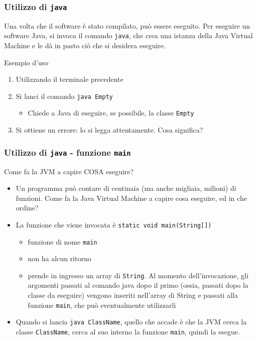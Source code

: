 \documentclass{beamer}
\begin{document}
\begin{frame}[fragile]
\frametitle{Utilizzo di \texttt{java}}
Una volta che il software è stato compilato, può essere eseguito. Per eseguire un software Java, si invoca il comando \texttt{java}, che crea una istanza della Java Virtual Machine e le dà in pasto ciò che si desidera eseguire.
\begin{block}{Esempio d'uso}
\begin{enumerate}
 \item Utilizzando il terminale precedente
 \item Si lanci il comando \texttt{java Empty}
 \begin{itemize}
  \item Chiede a Java di eseguire, se possibile, la classe \texttt{Empty}
 \end{itemize}
 \item Si ottiene un errore: lo si legga attentamente. Cosa significa?
\end{enumerate}
\end{block}
\end{frame}

\begin{frame}[fragile]
\frametitle{Utilizzo di \texttt{java} - funzione \texttt{main}}
\begin{block}{Come fa la JVM a capire COSA eseguire?}
\begin{itemize}
 \item Un programma può contare di centinaia (ma anche migliaia, milioni) di funzioni. Come fa la Java Virtual Machine a capire cosa eseguire, ed in che ordine?
 \item La funzione che viene invocata è \texttt{static void main(String[])}
 \begin{itemize}
  \item funzione di nome \texttt{main}
  \item non ha alcun ritorno
  \item prende in ingresso un array di \texttt{String}. Al momento dell'invocazione, gli argomenti passati al comando java dopo il primo (ossia, passati dopo la classe da eseguire) vengono inseriti nell'array di String e passati alla funzione \texttt{main}, che può eventualmente utilizzarli
 \end{itemize}
 \item Quando si lancia \texttt{java ClassName}, quello che accade è che la JVM cerca la classe \texttt{ClassName}, cerca al suo interno la funzione \texttt{main}, quindi la esegue.
\end{itemize}
\end{block}
\end{frame}
\end{document}
